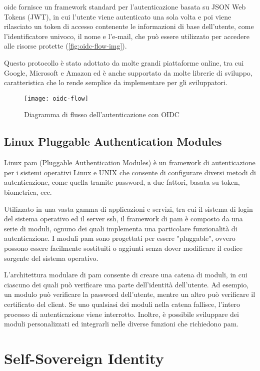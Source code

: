 \acrshort{oidc} fornisce un framework standard per l'autenticazione basata su JSON Web Tokens (JWT), in cui l'utente viene autenticato una sola volta e poi viene rilasciato un token di accesso contenente le informazioni di base dell'utente, come l'identificatore univoco, il nome e l'e-mail, che può essere utilizzato per accedere alle risorse protette (\autoref{fig:oidc-flow-img}).

Questo protocollo è stato adottato da molte grandi piattaforme online, tra cui Google, Microsoft e Amazon ed è anche supportato da molte librerie di sviluppo, caratteristica che lo rende semplice da implementare per gli sviluppatori.
\begin{figure}[H] 
    \centering 
    \texttt{[image: oidc-flow]} 
    \caption{Diagramma di flusso dell'autenticazione con OIDC}
    \label{fig:oidc-flow-img}
\end{figure}

\subsection{Linux Pluggable Authentication Modules}
Linux \acrshort{pam} (Pluggable Authentication Modules) è un framework di autenticazione per i sistemi operativi Linux e UNIX che consente di configurare diversi metodi di autenticazione, come quella tramite password, a due fattori, basata su token, biometrica, ecc.

Utilizzato in una vasta gamma di applicazioni e servizi, tra cui il sistema di login del sistema operativo ed il server \acrshort{ssh}, il framework di \acrshort{pam} è composto da una serie di moduli, ognuno dei quali implementa una particolare funzionalità di autenticazione. I moduli \acrshort{pam} sono progettati per essere "pluggable", ovvero possono essere facilmente sostituiti o aggiunti senza dover modificare il codice sorgente del sistema operativo.

L'architettura modulare di \acrshort{pam} consente di creare una catena di moduli, in cui ciascuno dei quali può verificare una parte dell'identità dell'utente. Ad esempio, un modulo può verificare la password dell'utente, mentre un altro può verificare il certificato del client. Se uno qualsiasi dei moduli nella catena fallisce, l'intero processo di autenticazione viene interrotto. Inoltre, è possibile sviluppare dei moduli personalizzati ed integrarli nelle diverse funzioni che richiedono \acrshort{pam}.

\section{Self-Sovereign Identity}

